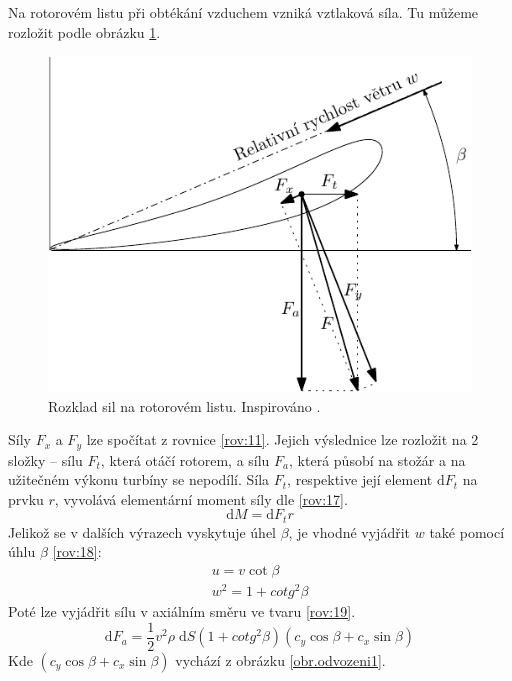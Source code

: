 	Na rotorovém listu při obtékání vzduchem vzniká vztlaková síla. Tu můžeme rozložit podle obrázku \ref{obr.profilsil}.
	\begin{figure}[h]
		\centering
		\includegraphics[]{obrazky/sily}
		\caption{Rozklad sil na rotorovém listu. Inspirováno \cite{Rychetnik:Motory}.}
		\label{obr.profilsil}
	\end{figure}
	Síly $F_x$ a $F_y$ lze spočítat z rovnice \ref{rov:11}. Jejich výslednice lze rozložit na 2 složky – sílu $F_t$, která otáčí rotorem, a sílu $F_a$, která působí na stožár a na užitečném výkonu turbíny se nepodílí. Síla $F_t$, respektive její element $\mathrm{d}F_t$ na prvku $r$, vyvolává elementární moment síly dle \eqref{rov:17}\cite{Rychetnik:Motory}.
	\begin{equation}
		\label{rov:17}
		\mathrm{d}M=\mathrm{d}F_t r
	\end{equation}
	Jelikož se v dalších výrazech vyskytuje úhel $\beta$, je vhodné vyjádřit $w$ také pomocí úhlu $\beta$ \eqref{rov:18}\cite{Rychetnik:Motory}:
	\begin{eqnarray}
				\label{rov:18}
			u=v \cot\beta \nonumber \\
			w^2 = 1 + cotg^2 \beta
	\end{eqnarray}
	Poté lze vyjádřit sílu v axiálním směru ve tvaru \eqref{rov:19}\cite{Rychetnik:Motory}.
	\begin{equation}
		\label{rov:19}
		\mathrm{d}F_a=\frac{1}{2}v^2\rho\;\mathrm{d}S(1+cotg^2 \beta)(c_y \cos \beta + c_x \sin \beta)
	\end{equation}
	Kde $(c_y \cos\beta+c_x \sin \beta)$ vychází z obrázku \ref{obr.odvozeni1}.
